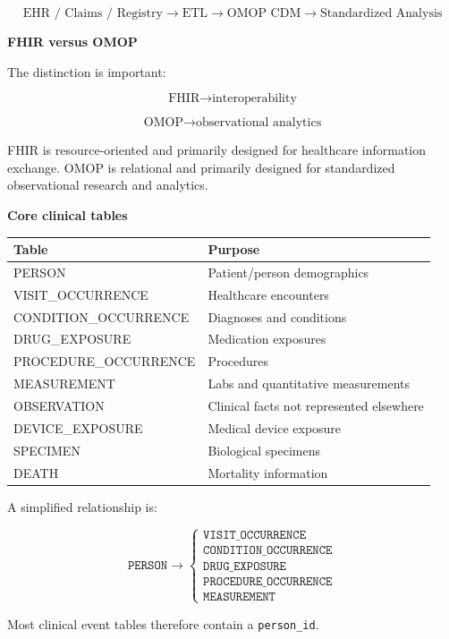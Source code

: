 \documentclass[11pt,letterpaper]{article}
\begin{document}
\[
\text{EHR / Claims / Registry}
\rightarrow
\text{ETL}
\rightarrow
\text{OMOP CDM}
\rightarrow
\text{Standardized Analysis}
\]

\textbf{FHIR versus OMOP}

The distinction is important:

\[
\boxed{\text{FHIR} \rightarrow \text{interoperability}}
\]

\[
\boxed{\text{OMOP} \rightarrow \text{observational analytics}}
\]

FHIR is resource-oriented and primarily designed for healthcare information
exchange. OMOP is relational and primarily designed for standardized
observational research and analytics.

\textbf{Core clinical tables}

\begin{center}
\begin{tabularx}{\textwidth}{lX}
\toprule
Table & Purpose \\
\midrule
PERSON & Patient/person demographics \\
VISIT\_OCCURRENCE & Healthcare encounters \\
CONDITION\_OCCURRENCE & Diagnoses and conditions \\
DRUG\_EXPOSURE & Medication exposures \\
PROCEDURE\_OCCURRENCE & Procedures \\
MEASUREMENT & Labs and quantitative measurements \\
OBSERVATION & Clinical facts not represented elsewhere \\
DEVICE\_EXPOSURE & Medical device exposure \\
SPECIMEN & Biological specimens \\
DEATH & Mortality information \\
\bottomrule
\end{tabularx}
\end{center}

A simplified relationship is:

\[
\texttt{PERSON}
\rightarrow
\begin{cases}
\texttt{VISIT\_OCCURRENCE} \\
\texttt{CONDITION\_OCCURRENCE} \\
\texttt{DRUG\_EXPOSURE} \\
\texttt{PROCEDURE\_OCCURRENCE} \\
\texttt{MEASUREMENT}
\end{cases}
\]

Most clinical event tables therefore contain a \texttt{person\_id}.
\end{document}

